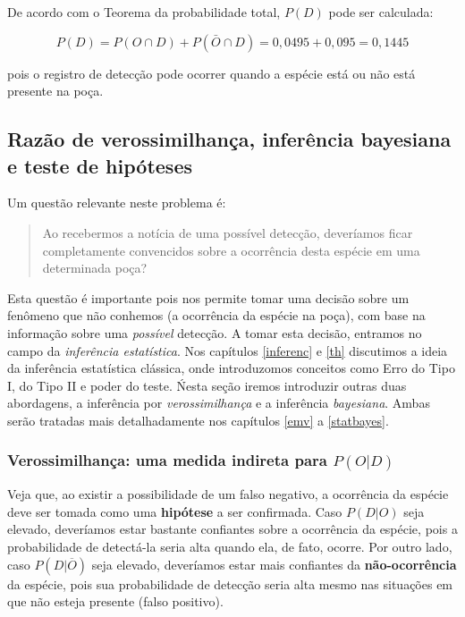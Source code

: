 \documentclass[
]{book}
\begin{document}
De acordo com o Teorema da probabilidade total, \(P(D)\) pode ser calculada:

\[P(D) = P(O \cap D) + P(\bar{O} \cap D) = 0,0495 + 0,095 = 0,1445\]

pois o registro de detecção pode ocorrer quando a espécie está ou não está presente na poça.

\hypertarget{razuxe3o-de-verossimilhanuxe7a-inferuxeancia-bayesiana-e-teste-de-hipuxf3teses}{%
\subsection{Razão de verossimilhança, inferência bayesiana e teste de hipóteses}\label{razuxe3o-de-verossimilhanuxe7a-inferuxeancia-bayesiana-e-teste-de-hipuxf3teses}}

Um questão relevante neste problema é:

\begin{quote}
Ao recebermos a notícia de uma possível detecção, deveríamos ficar completamente convencidos sobre a ocorrência desta espécie em uma determinada poça?
\end{quote}

Esta questão é importante pois nos permite tomar uma decisão sobre um fenômeno que não conhemos (a ocorrência da espécie na poça), com base na informação sobre uma \emph{possível} detecção. A tomar esta decisão, entramos no campo da \emph{inferência estatística}. Nos capítulos \ref{inferenc} e \ref{th} discutimos a ideia da inferência estatística clássica, onde introduzomos conceitos como Erro do Tipo I, do Tipo II e poder do teste. Ńesta seção iremos introduzir outras duas abordagens, a inferência por \emph{verossimilhança} e a inferência \emph{bayesiana}. Ambas serão tratadas mais detalhadamente nos capítulos \ref{emv} a \ref{statbayes}.

\hypertarget{verossimilhanuxe7a-uma-medida-indireta-para-pod}{%
\subsubsection*{\texorpdfstring{Verossimilhança: uma medida indireta para \(P(O|D)\)}{Verossimilhança: uma medida indireta para P(O\textbar D)}}\label{verossimilhanuxe7a-uma-medida-indireta-para-pod}}

Veja que, ao existir a possibilidade de um falso negativo, a ocorrência da espécie deve ser tomada como uma \textbf{hipótese} a ser confirmada. Caso \(P(D|O)\) seja elevado, deveríamos estar bastante confiantes sobre a ocorrência da espécie, pois a probabilidade de detectá-la seria alta quando ela, de fato, ocorre. Por outro lado, caso \(P(D|\overline{O})\) seja elevado, deveríamos estar mais confiantes da \textbf{não-ocorrência} da espécie, pois sua probabilidade de detecção seria alta mesmo nas situações em que não esteja presente (falso positivo).
\end{document}
